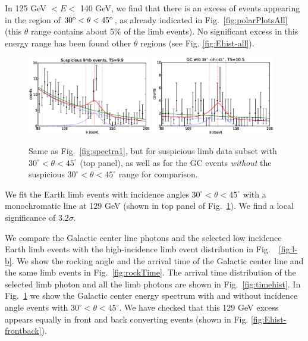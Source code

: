 \documentclass[aps,twocolumn,prd,superscriptaddress,showpacs,nofootinbib,fixfloat]{revtex4}
\newcommand{\degree}{^{\rm o}}
\begin{document}
In 125 GeV $< E <$ 140 GeV, we find that there is an excess
of events appearing in the region of $30\degree < \theta <
45\degree$, as already indicated in
Fig.~\ref{fig:polarPlotsAll} (this $\theta$ range contains
about 5\% of the limb events). No significant excess in this
energy range has been found other $\theta$ regions (see Fig.
\ref{fig:Ehist-all}). 

\begin{figure}
  \centering
  \includegraphics[width=0.48\textwidth]{plots/counts_suspiciousLimb.eps}
  \includegraphics[width=0.48\textwidth]{plots/counts_GC_wo3045.eps}
  \caption{Same as Fig.~\ref{fig:spectra1}, but for
  suspicious limb data subset with
  $30^\circ<\theta<45^\circ$ (top panel), as well as for the
  GC events \emph{without} the suspicious
  $30^\circ<\theta<45^\circ$ range for comparison.}
  \label{fig:spectra2}
\end{figure}

We fit the Earth limb events with incidence angles
$30^\circ<\theta<45^\circ$ with a monochromatic line at 129
GeV (shown in top panel of Fig.~\ref{fig:spectra2}). We find a local
significance of 3.2$\sigma$. 

We compare the Galactic center line photons and the selected
low incidence Earth limb events with the high-incidence limb
event distribution in Fig.~~\ref{fig:l-b}. We show the
rocking angle and the arrival time of the Galactic center
line and the same limb events in Fig.~\ref{fig:rockTime}.
The arrival time distribution of the selected limb photon
and all the limb photons are shown in
Fig.~\ref{fig:timehist}. In Fig.~\ref{fig:spectra2} we show
the Galactic center energy spectrum with and without
incidence angle events with $30^\circ<\theta<45^\circ$.  We
have checked that this 129 GeV excess appears equally in
front and back converting events (shown in Fig.
\ref{fig:Ehist-frontback}).
\end{document}
